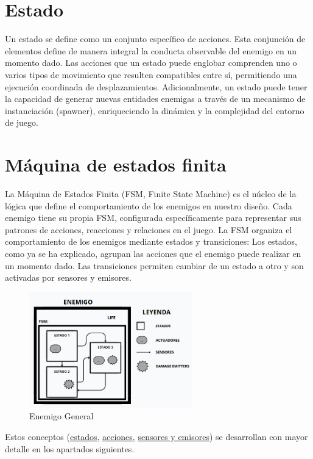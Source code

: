 \section{Estado}
\label{subsec:estado}

Un estado se define como un conjunto específico de acciones. Esta conjunción de elementos define de manera integral la conducta observable del enemigo en un momento dado. Las acciones que un estado puede englobar comprenden uno o varios tipos de movimiento que resulten compatibles entre sí, permitiendo una ejecución coordinada de desplazamientos. Adicionalmente, un estado puede tener la capacidad de generar nuevas entidades enemigas a través de un mecanismo de instanciación (spawner), enriqueciendo la dinámica y la complejidad del entorno de juego. 

\section{Máquina de estados finita}

La Máquina de Estados Finita (FSM, Finite State Machine) es el núcleo de la lógica que define el comportamiento de los enemigos en nuestro diseño. Cada enemigo tiene su propia FSM, configurada específicamente para representar sus patrones de acciones, reacciones y relaciones en el juego. La FSM organiza el comportamiento de los enemigos mediante estados y transiciones:
Los estados, como ya se ha explicado, agrupan las acciones que el enemigo puede realizar en un momento dado.
Las transiciones permiten cambiar de un estado a otro y son activadas por sensores y emisores.\\

\begin{figure}[t]
	\centering
	\includegraphics[height=5cm]{Imagenes/EnemigoGeneral.png}
	\caption{Enemigo General }
	\label{fig:EnemigoGeneral}
\end{figure}
Estos conceptos (\hyperref[subsec:estado]{estados}, \hyperref[subsec:acciones]{acciones}, \hyperref[subsec:sensores y emisores]{sensores y emisores}) se desarrollan con mayor detalle en los apartados siguientes.

